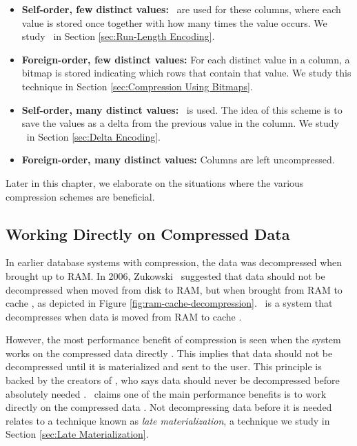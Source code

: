 \begin{itemize}
  \item \textbf{Self-order, few distinct values:} \rle~are used for these columns, where each value is stored once together with how many times the value occurs. We study \rle~in Section \ref{sec:Run-Length Encoding}.
  \item \textbf{Foreign-order, few distinct values:} For each distinct value in a column, a bitmap is stored indicating which rows that contain that value. We study this technique in Section \ref{sec:Compression Using Bitmaps}.
  \item \textbf{Self-order, many distinct values:} \dele~is used. The idea of this scheme is to save the values as a delta from the previous value in the column. We study \dele~in Section \ref{sec:Delta Encoding}.
  \item \textbf{Foreign-order, many distinct values:} Columns are left uncompressed.
\end{itemize}

Later in this chapter, we elaborate on the situations where the various compression schemes are beneficial.

\subsection{Working Directly on Compressed Data}
\label{sub:Working Directly on Compressed Data}


In earlier database systems with compression, the data was decompressed when brought up to RAM. In 2006, Zukowski \ea~suggested that data should not be decompressed when moved from disk to RAM, but when brought from RAM to cache \cite{Zukowski2006-oz}, as depicted in Figure \ref{fig:ram-cache-decompression}. \monetx~is a system that decompresses when data is moved from RAM to cache \cite{Johnson2008-cp}.

However, the most performance benefit of compression is seen when the system works on the compressed data directly \cite{Lemke2010-is}. This implies that data should not be decompressed until it is materialized and sent to the user. This principle is backed by the creators of \blink, who says data should never be decompressed before absolutely needed \cite{Barber2012-xt}. \oracle~claims one of the main performance benefits is to work directly on the compressed data \cite{Oracle2015-fs}. Not decompressing data before it is needed relates to a technique known as \textit{late materialization}, a technique we study in Section \ref{sec:Late Materialization}.


